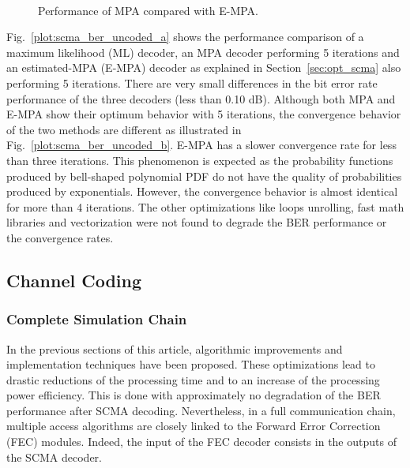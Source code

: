 \begin{figure}[htp]
  \centering
  \\
  \centering
  \caption{Performance of MPA compared with E-MPA.}
  \label{plot:scma_ber_uncoded}
\end{figure}

Fig.~\ref{plot:scma_ber_uncoded_a} shows the performance comparison of a maximum
likelihood (ML) decoder, an MPA decoder performing 5 iterations and an
estimated-MPA (E-MPA) decoder as explained in Section~\ref{sec:opt_scma} also
performing 5 iterations. There are very small differences in the bit error rate
performance of the three decoders (less than 0.10 dB). Although both MPA and
E-MPA show their optimum behavior with 5 iterations, the convergence behavior of
the two methods are different as illustrated in
Fig.~\ref{plot:scma_ber_uncoded_b}. E-MPA has a slower convergence rate for less
than three iterations. This phenomenon is expected as the probability functions
produced by bell-shaped polynomial PDF do not have the quality of probabilities
produced by exponentials. However, the convergence behavior is almost identical
for more than 4 iterations. The other optimizations like loops unrolling, fast
math libraries and vectorization were not found to degrade the BER performance
or the convergence rates.

\subsection{Channel Coding}
\label{sec:scma_fec}

\subsubsection{Complete Simulation Chain}
\label{sec:scma_fec_chain}

In the previous sections of this article, algorithmic improvements and
implementation techniques have been proposed. These optimizations lead to
drastic reductions of the processing time and to an increase of the processing
power efficiency. This is done with approximately no degradation of the BER
performance after SCMA decoding. Nevertheless, in a full communication chain,
multiple access algorithms are closely linked to the Forward Error Correction
(FEC) modules. Indeed, the input of the FEC decoder consists in the outputs of
the SCMA decoder.


